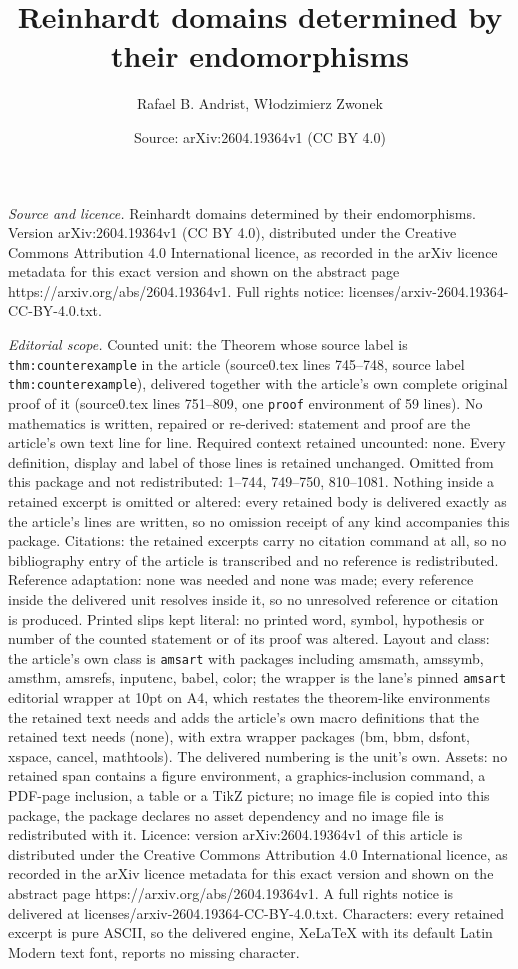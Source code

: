 \documentclass[10pt,a4paper]{amsart}
\title[Reinhardt domains determined by their endomorphisms]{Reinhardt domains determined by their endomorphisms}
\author{Rafael B. Andrist, W{\l}odzimierz Zwonek}
\date{Source: arXiv:2604.19364v1 (CC BY 4.0)}
\begin{document}
\maketitle

\noindent\emph{Source and licence.} Reinhardt domains determined by their endomorphisms. Version arXiv:2604.19364v1 (CC BY 4.0), distributed under the Creative Commons Attribution 4.0 International licence, as recorded in the arXiv licence metadata for this exact version and shown on the abstract page https://arxiv.org/abs/2604.19364v1. Full rights notice: licenses/arxiv-2604.19364-CC-BY-4.0.txt.\par\smallskip

\noindent\textit{Editorial scope.} Counted unit: the Theorem whose source label is \texttt{thm:counterexample} in the article (source0.tex lines 745--748, source label \texttt{thm:counterexample}), delivered together with the article's own complete original proof of it (source0.tex lines 751--809, one \texttt{proof} environment of 59 lines). No mathematics is written, repaired or re-derived: statement and proof are the article's own text line for line. Required context retained uncounted: none. Every definition, display and label of those lines is retained unchanged. Omitted from this package and not redistributed: 1--744, 749--750, 810--1081. Nothing inside a retained excerpt is omitted or altered: every retained body is delivered exactly as the article's lines are written, so no omission receipt of any kind accompanies this package. Citations: the retained excerpts carry no citation command at all, so no bibliography entry of the article is transcribed and no reference is redistributed. Reference adaptation: none was needed and none was made; every reference inside the delivered unit resolves inside it, so no unresolved reference or citation is produced. Printed slips kept literal: no printed word, symbol, hypothesis or number of the counted statement or of its proof was altered. Layout and class: the article's own class is \texttt{amsart} with packages including amsmath, amssymb, amsthm, amsrefs, inputenc, babel, color; the wrapper is the lane's pinned \texttt{amsart} editorial wrapper at 10pt on A4, which restates the theorem-like environments the retained text needs and adds the article's own macro definitions that the retained text needs (none), with extra wrapper packages (bm, bbm, dsfont, xspace, cancel, mathtools). The delivered numbering is the unit's own. Assets: no retained span contains a figure environment, a graphics-inclusion command, a PDF-page inclusion, a table or a TikZ picture; no image file is copied into this package, the package declares no asset dependency and no image file is redistributed with it. Licence: version arXiv:2604.19364v1 of this article is distributed under the Creative Commons Attribution 4.0 International licence, as recorded in the arXiv licence metadata for this exact version and shown on the abstract page https://arxiv.org/abs/2604.19364v1. A full rights notice is delivered at licenses/arxiv-2604.19364-CC-BY-4.0.txt. Characters: every retained excerpt is pure ASCII, so the delivered engine, XeLaTeX with its default Latin Modern text font, reports no missing character.
\end{document}
